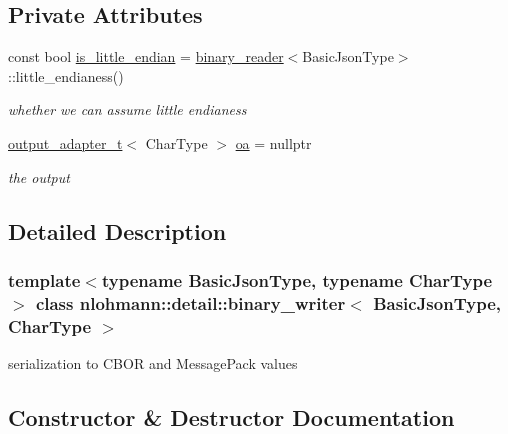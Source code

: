 \subsection*{Private Attributes}
\begin{DoxyCompactItemize}
\item 
\mbox{\label{classnlohmann_1_1detail_1_1binary__writer_a048887c907afe39759b777e8c888414c}} 
const bool \mbox{\hyperlink{classnlohmann_1_1detail_1_1binary__writer_a048887c907afe39759b777e8c888414c}{is\+\_\+little\+\_\+endian}} = \mbox{\hyperlink{classnlohmann_1_1detail_1_1binary__reader}{binary\+\_\+reader}}$<$Basic\+Json\+Type$>$\+::little\+\_\+endianess()
\begin{DoxyCompactList}\small\item\em whether we can assume little endianess \end{DoxyCompactList}\item 
\mbox{\label{classnlohmann_1_1detail_1_1binary__writer_a6f15b782a7900f50ef37d123008e601b}} 
\mbox{\hyperlink{namespacenlohmann_1_1detail_a9b680ddfb58f27eb53a67229447fc556}{output\+\_\+adapter\+\_\+t}}$<$ Char\+Type $>$ \mbox{\hyperlink{classnlohmann_1_1detail_1_1binary__writer_a6f15b782a7900f50ef37d123008e601b}{oa}} = nullptr
\begin{DoxyCompactList}\small\item\em the output \end{DoxyCompactList}\end{DoxyCompactItemize}


\subsection{Detailed Description}
\subsubsection*{template$<$typename Basic\+Json\+Type, typename Char\+Type$>$\newline
class nlohmann\+::detail\+::binary\+\_\+writer$<$ Basic\+Json\+Type, Char\+Type $>$}

serialization to C\+B\+OR and Message\+Pack values 

\subsection{Constructor \& Destructor Documentation}
\mbox{\label{classnlohmann_1_1detail_1_1binary__writer_a373289af95a946c19bb4a58a5df71a78}} 
